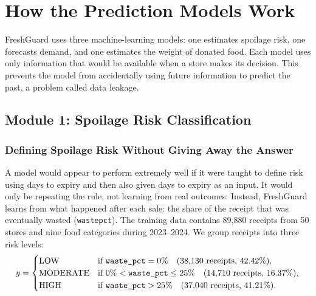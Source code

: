 \documentclass[12pt,a4paper]{article}
\renewcommand{\_}{\oldunderscore\allowbreak}
\begin{document}
\section{How the Prediction Models Work}

FreshGuard uses three machine-learning models: one estimates spoilage risk, one forecasts demand, and one estimates the weight of donated food. Each model uses only information that would be available when a store makes its decision. This prevents the model from accidentally using future information to predict the past, a problem called data leakage.

\subsection{Module 1: Spoilage Risk Classification}
\label{sec:spoilage_method}

\subsubsection{Defining Spoilage Risk Without Giving Away the Answer}
A model would appear to perform extremely well if it were taught to define risk using days to expiry and then also given days to expiry as an input. It would only be repeating the rule, not learning from real outcomes. Instead, FreshGuard learns from what happened after each sale: the share of the receipt that was eventually wasted (\texttt{waste\_pct}). The training data contains 89,880 receipts from 50 stores and nine food categories during 2023--2024. We group receipts into three risk levels:
\begin{equation}
    y = \begin{cases}
        \text{LOW}      & \text{if } \texttt{waste\_pct} = 0\% \quad (38{,}130\text{ receipts, } 42.42\%), \\
        \text{MODERATE} & \text{if } 0\% < \texttt{waste\_pct} \le 25\% \quad (14{,}710\text{ receipts, } 16.37\%), \\
        \text{HIGH}     & \text{if } \texttt{waste\_pct} > 25\% \quad (37{,}040\text{ receipts, } 41.21\%).
    \end{cases}
\end{equation}
\end{document}
